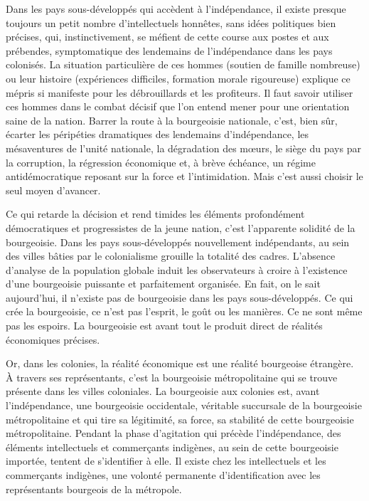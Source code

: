 \documentclass[french,twoside]{book} %
\begin{document}
\bigbreak
\noindent Dans les pays sous-développés qui accèdent à l’indépendance, il existe presque toujours un petit nombre d’intellectuels honnêtes, sans idées politiques bien précises, qui, instinctivement, se méfient de cette course aux postes et aux prébendes, symptomatique des lendemains de l’indépendance dans les pays colonisés. La situation particulière de ces hommes (soutien de famille nombreuse) ou leur histoire (expériences difficiles, formation morale rigoureuse) explique ce mépris si manifeste pour les débrouillards et les profiteurs. Il faut savoir utiliser ces hommes dans le combat décisif que l’on entend mener pour une orientation saine de la nation. Barrer la route à la bourgeoisie nationale, c’est, bien sûr, écarter les péripéties dramatiques des lendemains d’indépendance, les mésaventures de l’unité nationale, la dégradation des mœurs, le siège du pays par la corruption, la régression économique et, à brève échéance, un régime antidémocratique reposant sur la force et l’intimidation. Mais c’est aussi choisir le seul moyen d’avancer.\par
Ce qui retarde la décision et rend timides les éléments profondément démocratiques et progressistes de la jeune nation, c’est l’apparente solidité de la bourgeoisie. Dans les pays sous-développés nouvellement indépendants, au sein des villes bâties par le colonialisme grouille la totalité des cadres. L’absence d’analyse de la population globale induit les observateurs à croire à l’existence d’une bourgeoisie puissante et parfaitement   organisée. En fait, on le sait aujourd’hui, il n’existe pas de bourgeoisie dans les pays sous-développés. Ce qui crée la bourgeoisie, ce n’est pas l’esprit, le goût ou les manières. Ce ne sont même pas les espoirs. La bourgeoisie est avant tout le produit direct de réalités économiques précises.\par
Or, dans les colonies, la réalité économique est une réalité bourgeoise étrangère. À travers ses représentants, c’est la bourgeoisie métropolitaine qui se trouve présente dans les villes coloniales. La bourgeoisie aux colonies est, avant l’indépendance, une bourgeoisie occidentale, véritable succursale de la bourgeoisie métropolitaine et qui tire sa légitimité, sa force, sa stabilité de cette bourgeoisie métropolitaine. Pendant la phase d’agitation qui précède l’indépendance, des éléments intellectuels et commerçants indigènes, au sein de cette bourgeoisie importée, tentent de s’identifier à elle. Il existe chez les intellectuels et les commerçants indigènes, une volonté permanente d’identification avec les représentants bourgeois de la métropole.\par
\end{document}
